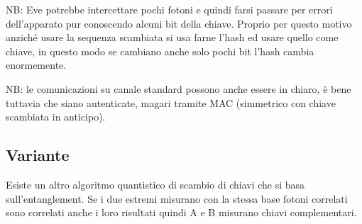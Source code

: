 NB: Eve potrebbe intercettare pochi fotoni e quindi farsi passare per errori dell'apparato pur conoscendo alcuni bit della chiave.
Proprio per questo motivo anziché usare la sequenza scambiata si usa farne l'hash ed usare quello come chiave, in questo modo se cambiano anche solo pochi bit l'hash cambia enormemente.


NB: le comunicazioni su canale standard possono anche essere in chiaro, è bene tuttavia che siano autenticate, magari tramite MAC (simmetrico con chiave scambiata in anticipo).

\subsection{Variante}
Esiste un altro algoritmo quantistico di scambio di chiavi che si basa sull'entanglement.
Se i due estremi misurano con la stessa base fotoni correlati sono correlati anche i loro risultati quindi A e B misurano chiavi complementari.
